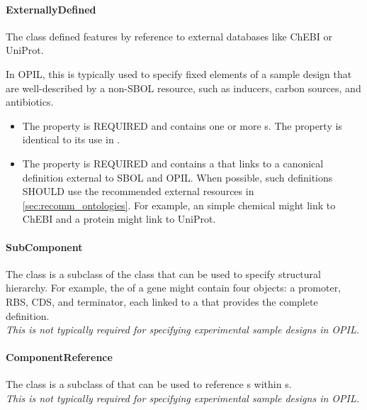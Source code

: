 \paragraph{ExternallyDefined}
\label{sec:sbol:ExternallyDefined}

The  class defined features by reference to external databases like ChEBI or UniProt.

In OPIL, this is typically used to specify fixed elements of a sample design that are well-described by a non-SBOL resource, such as inducers, carbon sources, and antibiotics.

\begin{itemize}
\item \label{sec:sbol:type:ED}
The  property is REQUIRED and contains one or more s. The  property is identical to its use in .

\item \label{sec:sbol:definition:ED}
The  property is REQUIRED and contains a  that links to a canonical definition external to SBOL and OPIL.
When possible, such definitions SHOULD use the recommended external resources in \ref{sec:recomm_ontologies}.
For example, an  simple chemical might link to ChEBI and a protein might link to UniProt.
\end{itemize}

\paragraph{SubComponent}
\label{sec:sbol:SubComponent}

The  class is a subclass of the  class that can be used to specify structural hierarchy.
For example, the  of a gene might contain four  objects: a promoter, RBS, CDS, and terminator, each linked to a  that provides the complete definition.
\\{\em This is not typically required for specifying experimental sample designs in OPIL.}

\paragraph{ComponentReference}
\label{sec:sbol:ComponentReference}

The  class is a subclass of  that can be used to reference s within s. 
\\{\em This is not typically required for specifying experimental sample designs in OPIL.}

